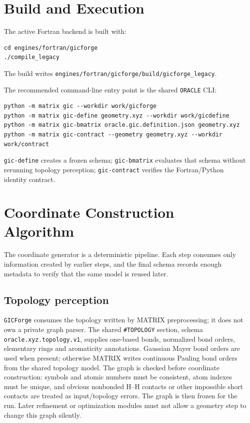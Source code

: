 \documentclass[11pt]{article}
\newcommand{\program}{\texttt{GICForge}}
\newcommand{\oracle}{\texttt{ORACLE}}
\begin{document}
\section{Build and Execution}

The active Fortran backend is built with:

\begin{lstlisting}[style=oracle]
cd engines/fortran/gicforge
./compile_legacy
\end{lstlisting}

\noindent
The build writes \texttt{engines/fortran/gicforge/build/gicforge\_legacy}.

The recommended command-line entry point is the shared \oracle{} CLI:

\begin{lstlisting}[style=oracle]
python -m matrix gic --workdir work/gicforge
python -m matrix gic-define geometry.xyz --workdir work/gicdefine
python -m matrix gic-bmatrix oracle.gic.definition.json geometry.xyz
python -m matrix gic-contract --geometry geometry.xyz --workdir work/contract
\end{lstlisting}

\noindent
\texttt{gic-define} creates a frozen schema; \texttt{gic-bmatrix} evaluates that
schema without rerunning topology perception; \texttt{gic-contract} verifies the
Fortran/Python identity contract.

\section{Coordinate Construction Algorithm}

The coordinate generator is a deterministic pipeline.  Each step consumes only
information created by earlier steps, and the final schema records enough
metadata to verify that the same model is reused later.

\subsection{Topology perception}

\program{} consumes the topology written by MATRIX preprocessing; it does not
own a private graph parser.  The shared \texttt{\#TOPOLOGY} section, schema
\texttt{oracle.xyz.topology.v1}, supplies one-based bonds, normalized bond
orders, elementary rings and aromaticity annotations.  Gaussian Mayer bond
orders are used when present; otherwise MATRIX writes continuous Pauling bond
orders from the shared topology model.  The graph is checked before coordinate
construction: symbols and atomic numbers must be consistent, atom indexes must
be unique, and obvious nonbonded H--H contacts or other impossible short
contacts are treated as input/topology errors.  The graph is then frozen for
the run.  Later refinement or optimization modules must not allow a geometry
step to change this graph silently.
\end{document}
